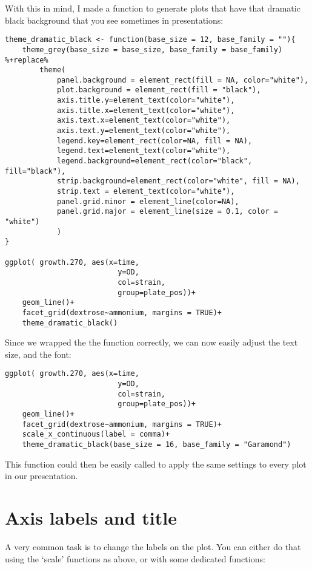 \documentclass[11pt]{article}
\begin{document}
With this in mind, I made a function to generate plots that have that
dramatic black background that you see sometimes in presentations:

\begin{verbatim}
theme_dramatic_black <- function(base_size = 12, base_family = ""){
    theme_grey(base_size = base_size, base_family = base_family) %+replace%
        theme(
            panel.background = element_rect(fill = NA, color="white"),
            plot.background = element_rect(fill = "black"),
            axis.title.y=element_text(color="white"),
            axis.title.x=element_text(color="white"),
            axis.text.x=element_text(color="white"),
            axis.text.y=element_text(color="white"),
            legend.key=element_rect(color=NA, fill = NA),
            legend.text=element_text(color="white"),
            legend.background=element_rect(color="black", fill="black"),
            strip.background=element_rect(color="white", fill = NA),
            strip.text = element_text(color="white"),
            panel.grid.minor = element_line(color=NA),
            panel.grid.major = element_line(size = 0.1, color = "white")
            )
}

ggplot( growth.270, aes(x=time,
                          y=OD,
                          col=strain,
                          group=plate_pos))+
    geom_line()+
    facet_grid(dextrose~ammonium, margins = TRUE)+
    theme_dramatic_black()
\end{verbatim}


Since we wrapped the the function correctly, we can now easily adjust
the text size, and the font:

\begin{verbatim}
ggplot( growth.270, aes(x=time,
                          y=OD,
                          col=strain,
                          group=plate_pos))+
    geom_line()+
    facet_grid(dextrose~ammonium, margins = TRUE)+
    scale_x_continuous(label = comma)+
    theme_dramatic_black(base_size = 16, base_family = "Garamond")
\end{verbatim}


This function could then be easily called to apply the same settings
to every plot in our presentation.
\section{Axis labels and title}
\label{sec-2}


A very common task is to change the labels on the plot. You can either
do that using the `scale' functions as above, or with some dedicated
functions:
\end{document}
